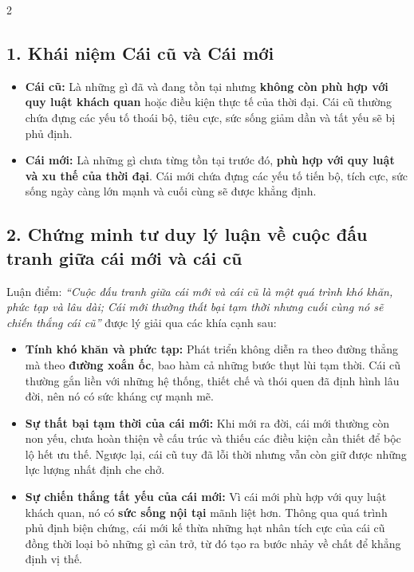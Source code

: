 \documentclass[9pt,a4paper]{extarticle}
\begin{document}
\begin{multicols*}{2}
\subsection*{1. Khái niệm Cái cũ và Cái mới}

\begin{itemize}
\item \textbf{Cái cũ:} Là những gì đã và đang tồn tại nhưng \textbf{không còn phù hợp với quy luật khách quan} hoặc điều kiện thực tế của thời đại. Cái cũ thường chứa đựng các yếu tố thoái bộ, tiêu cực, sức sống giảm dần và tất yếu sẽ bị phủ định.
\item \textbf{Cái mới:} Là những gì chưa từng tồn tại trước đó, \textbf{phù hợp với quy luật và xu thế của thời đại}. Cái mới chứa đựng các yếu tố tiến bộ, tích cực, sức sống ngày càng lớn mạnh và cuối cùng sẽ được khẳng định.
\end{itemize}

\subsection*{2. Chứng minh tư duy lý luận về cuộc đấu tranh giữa cái mới và cái cũ}

Luận điểm: \textit{``Cuộc đấu tranh giữa cái mới và cái cũ là một quá trình khó khăn, phức tạp và lâu dài; Cái mới thường thất bại tạm thời nhưng cuối cùng nó sẽ chiến thắng cái cũ''} được lý giải qua các khía cạnh sau:

\begin{itemize}
\item \textbf{Tính khó khăn và phức tạp:} Phát triển không diễn ra theo đường thẳng mà theo \textbf{đường xoắn ốc}, bao hàm cả những bước thụt lùi tạm thời. Cái cũ thường gắn liền với những hệ thống, thiết chế và thói quen đã định hình lâu đời, nên nó có sức kháng cự mạnh mẽ.
\item \textbf{Sự thất bại tạm thời của cái mới:} Khi mới ra đời, cái mới thường còn non yếu, chưa hoàn thiện về cấu trúc và thiếu các điều kiện cần thiết để bộc lộ hết ưu thế. Ngược lại, cái cũ tuy đã lỗi thời nhưng vẫn còn giữ được những lực lượng nhất định che chở.
\item \textbf{Sự chiến thắng tất yếu của cái mới:} Vì cái mới phù hợp với quy luật khách quan, nó có \textbf{sức sống nội tại} mãnh liệt hơn. Thông qua quá trình phủ định biện chứng, cái mới kế thừa những hạt nhân tích cực của cái cũ đồng thời loại bỏ những gì cản trở, từ đó tạo ra bước nhảy về chất để khẳng định vị thế.
\end{itemize}


\end{multicols*}
\end{document}
